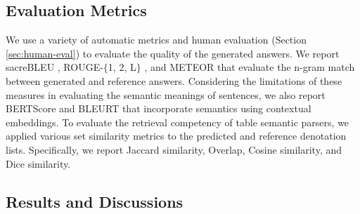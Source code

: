 \documentclass[11pt,a4paper]{article}
\newcommand{\ours}{FeTaQA\xspace}
\begin{document}
\subsection{Evaluation Metrics}
We use a variety of automatic metrics and human evaluation (Section \ref{sec:human-eval}) to evaluate the quality of the generated answers. We report sacreBLEU \cite{post-2018-call}, ROUGE-$\{$1, 2, L$\}$ \cite{lin-2004-rouge}, and METEOR \cite{banerjee-lavie-2005-meteor} that evaluate the n-gram match between generated and reference answers. Considering the limitations of these measures in evaluating the semantic meanings of sentences, we also report BERTScore \cite{zhang2020bertscore} and BLEURT \cite{sellam2020bleurt} that incorporate semantics using contextual embeddings.
To evaluate the retrieval competency of table semantic parsers, we applied various set similarity metrics to the predicted and reference denotation lists. Specifically, we report Jaccard similarity, Overlap, Cosine similarity, and Dice similarity.

\subsection{Results and Discussions}
\label{sec:results}

\begin{table*}[]
\centering
{}
\caption{Experiment results on the test split of \ours.}
\label{tab:experiment-results}
\end{table*}
\end{document}
